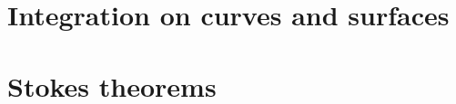 \documentclass{../../large}
\begin{document}
\section{Integration on curves and surfaces}

\begin{prb}
\end{prb}

\begin{prb}
\end{prb}


\section{Stokes theorems}
\begin{prb}
\end{prb}

\begin{prb}
\end{prb}

\begin{prb}
\end{prb}
\end{document}
